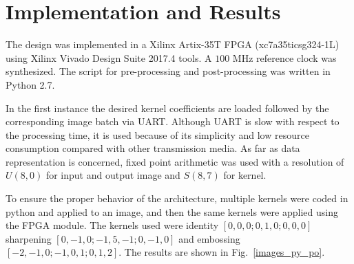 \documentclass[conference,compsoc]{IEEEtran}
\begin{document}
\section{Implementation and Results}\label{sec:implementation}
The design was implemented in a Xilinx Artix-35T FPGA (xc7a35ticsg324-1L) using
Xilinx Vivado Design Suite 2017.4 tools. A $100$ MHz reference clock
was synthesized. The script for pre-processing and post-processing was written in Python
2.7.

In the first instance the desired kernel coefficients are loaded followed by
the corresponding image batch via UART\@. Although UART is slow with respect to
the processing time, it is used because of its simplicity and low resource
consumption compared with other transmission media.
As far as data representation is concerned, fixed point arithmetic was used with
a resolution of $U(8,0)$ for input and output image and $S(8,7)$ for kernel.

To ensure the proper behavior of the architecture, multiple kernels were
coded in python and applied to an image, and then the same kernels were applied
using the FPGA module. The kernels used were identity $[0, 0, 0; 0, 1, 0; 0, 0,
0]$ sharpening $[0, -1, 0; -1, 5, -1; 0, -1, 0]$ and embossing $[-2, -1, 0; -1,
0, 1; 0, 1, 2]$. The results are shown in Fig.~\ref{images_py_po}. 
\end{document}
